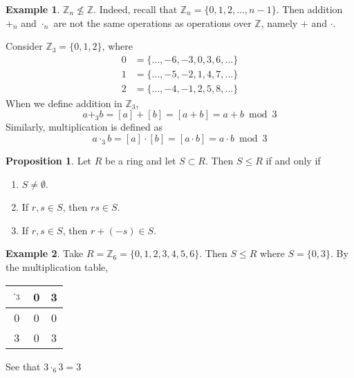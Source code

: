 \documentclass[11pt]{article}
\theoremstyle{definition}\newtheorem{definition}{Definition}
\theoremstyle{definition}\newtheorem*{notation}{Notation}
\theoremstyle{definition}\newtheorem{example}{Example}
\theoremstyle{theorem}\newtheorem{theorem}{Theorem}
\theoremstyle{theorem}\newtheorem{corollary}{Corollary}
\theoremstyle{theorem}\newtheorem{proposition}{Proposition}
\theoremstyle{theorem}\newtheorem{lemma}{Lemma}
\theoremstyle{theorem}\newtheorem{question}{Question}
\theoremstyle{remark}\newtheorem{remark}{Remark}
\newcommand{\Z}{\mathbb{Z}}
\begin{document}
\begin{example}
    $\Z_n \not\leq \Z$. Indeed, recall that $\Z_n = \{0, 1, 2,..., n - 1\}$. Then addition $+_n$ and $\cdot_n$ are not the same operations as operations over $\Z$, namely $+$ and $\cdot$.

    Consider $\Z_3 = \{0, 1, 2\}$, where
    \begin{align*}
        0 &= \{..., -6, -3, 0, 3, 6, ...\} \\
        1 &= \{..., -5, -2, 1, 4, 7, ...\} \\
        2 &= \{..., -4, -1, 2, 5, 8, ...\}
    \end{align*}
    When we define addition in $\Z_3$,
    \begin{equation*}
        a +_3 b = [a] + [b] = [a + b] = a + b \bmod 3
    \end{equation*}
    Similarly, multiplication is defined as
    \begin{equation*}
        a \cdot_3 b = [a] \cdot [b] = [a \cdot b] = a \cdot b \bmod 3
    \end{equation*}
\end{example}

\begin{proposition}
    Let $R$ be a ring and let $S \subset R$. Then $S \leq R$ if and only if
    \begin{enumerate}
        \item $S \neq \emptyset$.
        \item If $r, s \in S$, then $rs \in S$.
        \item If $r, s \in S$, then $r + (-s) \in S$.
    \end{enumerate}
\end{proposition}

\begin{example}
    Take $R = \Z_6 = \{0, 1, 2, 3, 4, 5, 6\}$. Then $S \leq R$ where $S = \{0, 3\}$. \color{Green}{Is $S$ a ring with identity?} \color{black} By the multiplication table,
    \begin{center}
        \begin{tabular}{c|cc} 
            $\cdot_3$ & 0 & 3 \\ \hline
            0 & 0 & 0 \\
            3 & 0 & 3
        \end{tabular}
    \end{center}
    See that $3 \cdot_6 3 = 3$
\end{example}
\end{document}
